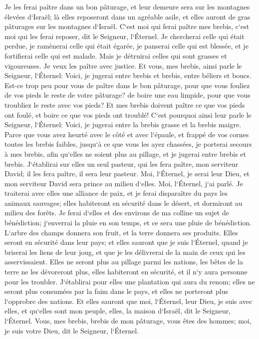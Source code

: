 \verse Je les ferai paître dans un bon pâturage, et leur demeure sera sur les montagnes élevées d`Israël; là elles reposeront dans un agréable asile, et elles auront de gras pâturages sur les montagnes d`Israël. 
\verse C`est moi qui ferai paître mes brebis, c`est moi qui les ferai reposer, dit le Seigneur, l`Éternel. 
\verse Je chercherai celle qui était perdue, je ramènerai celle qui était égarée, je panserai celle qui est blessée, et je fortifierai celle qui est malade. Mais je détruirai celles qui sont grasses et vigoureuses. Je veux les paître avec justice. 
\verse Et vous, mes brebis, ainsi parle le Seigneur, l`Éternel: Voici, je jugerai entre brebis et brebis, entre béliers et boucs. 
\verse Est-ce trop peu pour vous de paître dans le bon pâturage, pour que vous fouliez de vos pieds le reste de votre pâturage? de boire une eau limpide, pour que vous troubliez le reste avec vos pieds? 
\verse Et mes brebis doivent paître ce que vos pieds ont foulé, et boire ce que vos pieds ont troublé! 
\verse C`est pourquoi ainsi leur parle le Seigneur, l`Éternel: Voici, je jugerai entre la brebis grasse et la brebis maigre. 
\verse Parce que vous avez heurté avec le côté et avec l`épaule, et frappé de vos cornes toutes les brebis faibles, jusqu`à ce que vous les ayez chassées, 
\verse je porterai secours à mes brebis, afin qu`elles ne soient plus au pillage, et je jugerai entre brebis et brebis. 
\verse J`établirai sur elles un seul pasteur, qui les fera paître, mon serviteur David; il les fera paître, il sera leur pasteur. 
\verse Moi, l`Éternel, je serai leur Dieu, et mon serviteur David sera prince au milieu d`elles. Moi, l`Éternel, j`ai parlé. 
\verse Je traiterai avec elles une alliance de paix, et je ferai disparaître du pays les animaux sauvages; elles habiteront en sécurité dans le désert, et dormiront au milieu des forêts. 
\verse Je ferai d`elles et des environs de ma colline un sujet de bénédiction; j`enverrai la pluie en son temps, et ce sera une pluie de bénédiction. 
\verse L`arbre des champs donnera son fruit, et la terre donnera ses produits. Elles seront en sécurité dans leur pays; et elles sauront que je suis l`Éternel, quand je briserai les liens de leur joug, et que je les délivrerai de la main de ceux qui les asservissaient. 
\verse Elles ne seront plus au pillage parmi les nations, les bêtes de la terre ne les dévoreront plus, elles habiteront en sécurité, et il n`y aura personne pour les troubler. 
\verse J`établirai pour elles une plantation qui aura du renom; elles ne seront plus consumées par la faim dans le pays, et elles ne porteront plus l`opprobre des nations. 
\verse Et elles sauront que moi, l`Éternel, leur Dieu, je suis avec elles, et qu`elles sont mon peuple, elles, la maison d`Israël, dit le Seigneur, l`Éternel. 
\verse Vous, mes brebis, brebis de mon pâturage, vous êtes des hommes; moi, je suis votre Dieu, dit le Seigneur, l`Éternel. 

